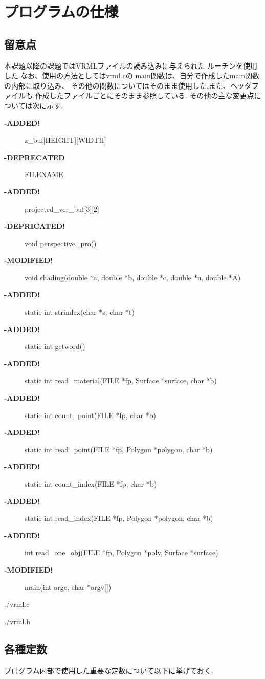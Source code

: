 \documentclass[a4j,dvipdfmx]{jsarticle}
\begin{document}
\section{プログラムの仕様}
\subsection{留意点}
本課題以降の課題ではVRMLファイルの読み込みに与えられた
ルーチンを使用した.なお、使用の方法としてはvrml.cの
main関数は、自分で作成したmain関数の内部に取り込み、
その他の関数についてはそのまま使用した.また、ヘッダファイルも
作成したファイルごとにそのまま参照している.
その他の主な変更点については次に示す.
\begin{description}
\item[{\bf -ADDED!}]z\_buf[HEIGHT][WIDTH]
\item[{\bf -DEPRECATED}]FILENAME
\item[{\bf -ADDED!}]projected\_ver\_buf[3][2]
\item[{\bf -DEPRICATED!}]void perspective\_pro()
\item[{\bf -MODIFIED!}]void shading(double *a, double *b, double *c, double *n, double *A)
\item[{\bf -ADDED!}]static int strindex(char *s, char *t)
\item[{\bf -ADDED!}]static int getword()
\item[{\bf -ADDED!}]static int read\_material(FILE *fp, Surface *surface, char *b)
\item[{\bf -ADDED!}]static int count\_point(FILE *fp, char *b)
\item[{\bf -ADDED!}]static int read\_point(FILE *fp, Polygon *polygon, char *b)
\item[{\bf -ADDED!}]static int count\_index(FILE *fp, char *b)
\item[{\bf -ADDED!}]static int read\_index(FILE *fp, Polygon *polygon, char *b)
\item[{\bf -ADDED!}]int read\_one\_obj(FILE *fp, Polygon *poly, Surface *surface)
\item[{\bf -MODIFIED!}]main(int argc, char *argv[])
\end{description}


                {./vrml.c}
                

                {./vrml.h}

\subsection{各種定数}
プログラム内部で使用した重要な定数について以下に挙げておく.
\end{document}
